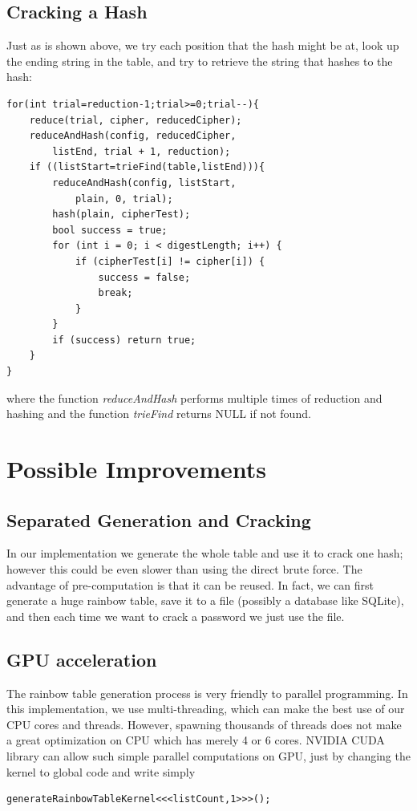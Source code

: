 \documentclass{article}
\begin{document}
\begin{multicols}{2}
\subsection{Cracking a Hash}
Just as is shown above, we try each position that the hash might be at, look up the ending string in the table, and try to retrieve the string that hashes to the hash:
\begin{verbatim}
for(int trial=reduction-1;trial>=0;trial--){
	reduce(trial, cipher, reducedCipher);
	reduceAndHash(config, reducedCipher, 
		listEnd, trial + 1, reduction);
	if ((listStart=trieFind(table,listEnd))){
		reduceAndHash(config, listStart,
			plain, 0, trial);
		hash(plain, cipherTest);
		bool success = true;
		for (int i = 0; i < digestLength; i++) {
			if (cipherTest[i] != cipher[i]) {
				success = false;
				break;
			}
		}
		if (success) return true;
	}
}
\end{verbatim}
where the function \textit{reduceAndHash} performs multiple times of reduction and hashing and the function \textit{trieFind} returns NULL if not found.

\section{Possible Improvements}
\subsection{Separated Generation and Cracking}
In our implementation we generate the whole table and use it to crack one hash; however this could be even slower than using the direct brute force. The advantage of pre-computation is that it can be reused. In fact, we can first generate a huge rainbow table, save it to a file (possibly a database like SQLite), and then each time we want to crack a password we just use the file.
\subsection{GPU acceleration}
The rainbow table generation process is very friendly to parallel programming. In this implementation, we use multi-threading, which can make the best use of our CPU cores and threads. However, spawning thousands of threads does not make a great optimization on CPU which has merely 4 or 6 cores. NVIDIA CUDA library can allow such simple parallel computations on GPU, just by changing the kernel to global code and write simply
\begin{verbatim}
generateRainbowTableKernel<<<listCount,1>>>();
\end{verbatim}


\end{multicols}
\end{document}
